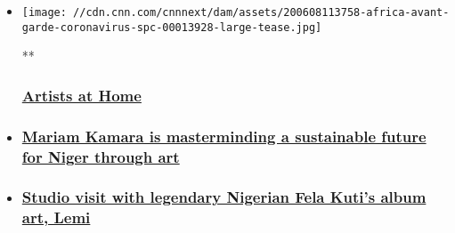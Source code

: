 \begin{itemize}
\item
  \href{/videos/world/2020/06/08/africa-avant-garde-coronavirus-spc.cnn}{}

  \texttt{[image: //cdn.cnn.com/cnnnext/dam/assets/200608113758-africa-avant-garde-coronavirus-spc-00013928-large-tease.jpg]}

  **

  \hypertarget{artists-at-home}{%
  \subsubsection{\texorpdfstring{\href{/videos/world/2020/06/08/africa-avant-garde-coronavirus-spc.cnn}{Artists
  at Home}}{Artists at Home}}\label{artists-at-home}}
\item
  \hypertarget{mariam-kamara-is-masterminding-a-sustainable-future-for-niger-through-art}{%
  \subsubsection{\texorpdfstring{\href{/style/article/mariam-kamara-architecture/index.html}{Mariam
  Kamara is masterminding a sustainable future for Niger through
  art}}{Mariam Kamara is masterminding a sustainable future for Niger through art}}\label{mariam-kamara-is-masterminding-a-sustainable-future-for-niger-through-art}}
\item
  \hypertarget{studio-visit-with-legendary-nigerian-fela-kutis-album-art-lemi-}{%
  \subsubsection{\texorpdfstring{\href{/videos/arts/2020/04/01/lemi-ghariokwu-fela-kuti-style-orig.cnn}{Studio
  visit with legendary Nigerian Fela Kuti's album art, Lemi
  }}{Studio visit with legendary Nigerian Fela Kuti's album art, Lemi }}\label{studio-visit-with-legendary-nigerian-fela-kutis-album-art-lemi-}}
\end{itemize}

